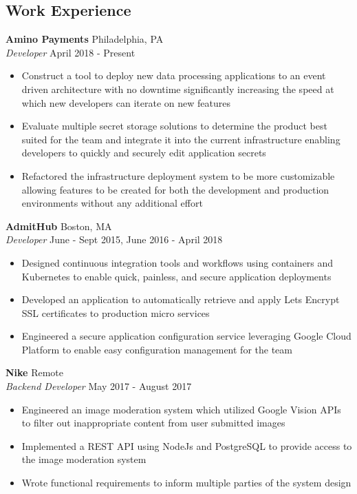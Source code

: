 \documentclass[10pt]{article}
\begin{document}
\begin{flushleft}
\section{Work Experience}
	\vspace{1em}
	\textbf{Amino Payments} \hfill Philadelphia, PA \\
	\textit{Developer} \hfill April 2018 - Present \\
	\begin{itemize}
		\item Construct a tool to deploy new data processing 
		      applications to an event driven architecture with no 
		      downtime significantly increasing the speed at which new 
		      developers can iterate on new features
	        \item Evaluate multiple secret storage solutions to determine 
		      the product best suited for the team and integrate it 
		      into the current infrastructure enabling developers to 
		      quickly and securely edit application secrets
	        \item Refactored the infrastructure deployment system to be more 
		      customizable allowing features to be created for both the 
		      development and production environments without any 
		      additional effort
	\end{itemize}


	\textbf{AdmitHub} \hfill Boston, MA \\
	\textit{Developer} \hfill June - Sept 2015, June 2016 - April 2018 \\
	\begin{itemize}
		\item Designed continuous integration tools and workflows using 
		      containers and Kubernetes to enable quick, painless, and 
		      secure application deployments
		\item Developed an application to automatically retrieve and 
		      apply Lets Encrypt SSL certificates to production micro 
		      services
		\item Engineered a secure application configuration service 
		      leveraging Google Cloud Platform to enable easy 
		      configuration management for the team
	\end{itemize}

	\vspace{1em}
	\textbf{Nike} \hfill Remote \\
	\textit{Backend Developer} \hfill May 2017 - August 2017 \\
	\begin{itemize}
		\item Engineered an image moderation system which utilized 
		      Google Vision APIs to filter out inappropriate content 
		      from user submitted images
		\item Implemented a REST API using NodeJs and PostgreSQL to 
		      provide access to the image moderation system
		\item Wrote functional requirements to inform multiple parties  
		      of the system design
	\end{itemize}


\end{flushleft}
\end{document}
